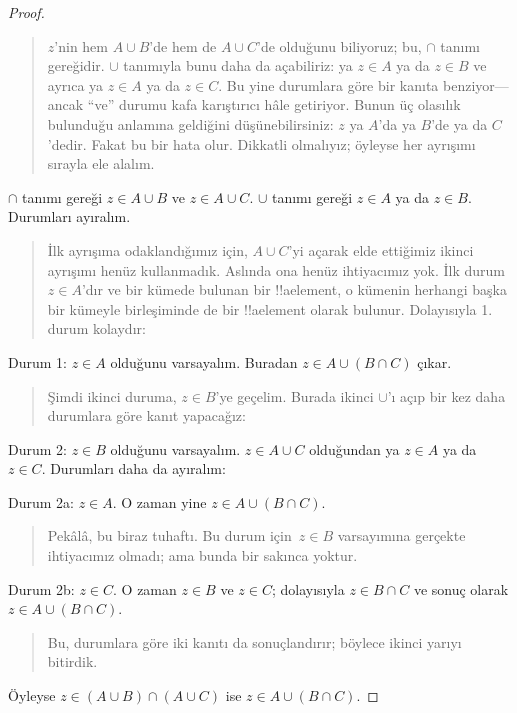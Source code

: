 \documentclass[../../../include/open-logic-section]{subfiles}
\begin{document}
\begin{proof}
\begin{quote}
$z$'nin hem $A \cup B$'de hem de $A \cup C$'de olduğunu biliyoruz; bu,
$\cap$ tanımı gereğidir. $\cup$ tanımıyla bunu daha da açabiliriz: ya $z \in
A$ ya da $z \in B$ ve ayrıca ya $z \in A$ ya da $z \in C$. Bu yine
durumlara göre bir kanıta benziyor---ancak ``ve'' durumu kafa karıştırıcı
hâle getiriyor. Bunun üç olasılık bulunduğu anlamına geldiğini
düşünebilirsiniz: $z$ ya $A$'da ya $B$'de ya da $C$'dedir. Fakat bu bir
hata olur. Dikkatli olmalıyız; öyleyse her ayrışımı sırayla ele alalım.
\end{quote}
$\cap$ tanımı gereği $z \in A \cup B$ ve $z \in A \cup C$. $\cup$
tanımı gereği $z \in A$ ya da $z \in B$. Durumları ayıralım.
\begin{quote}
İlk ayrışıma odaklandığımız için, $A \cup C$'yi açarak elde ettiğimiz
ikinci ayrışımı henüz kullanmadık. Aslında ona henüz ihtiyacımız yok.
İlk durum $z \in A$'dır ve bir kümede bulunan bir !!a{element}, o kümenin
herhangi başka bir kümeyle birleşiminde de bir !!a{element} olarak bulunur. Dolayısıyla 1.
durum kolaydır:
\end{quote}
Durum 1: $z \in A$ olduğunu varsayalım. Buradan $z \in A \cup (B \cap
C)$ çıkar.
\begin{quote}
Şimdi ikinci duruma, $z \in B$'ye geçelim. Burada ikinci $\cup$'ı açıp
bir kez daha durumlara göre kanıt yapacağız:
\end{quote}
Durum 2: $z \in B$ olduğunu varsayalım. $z \in A \cup C$ olduğundan ya
$z \in A$ ya da $z \in C$. Durumları daha da ayıralım:

Durum 2a: $z \in A$. O zaman yine $z \in A \cup (B \cap C)$.
\begin{quote}
Pekâlâ, bu biraz tuhaftı. Bu durum için~$z \in B$ varsayımına gerçekte
ihtiyacımız olmadı; ama bunda bir sakınca yoktur.
\end{quote}
Durum 2b: $z \in C$. O zaman $z \in B$ ve $z \in C$; dolayısıyla $z
\in B \cap C$ ve sonuç olarak $z \in A \cup (B \cap C)$.
\begin{quote}
Bu, durumlara göre iki kanıtı da sonuçlandırır; böylece ikinci yarıyı
bitirdik.
\end{quote}
Öyleyse $z \in (A \cup B) \cap (A \cup C)$ ise $z \in A \cup (B \cap C)$.
\end{proof}
\end{document}
